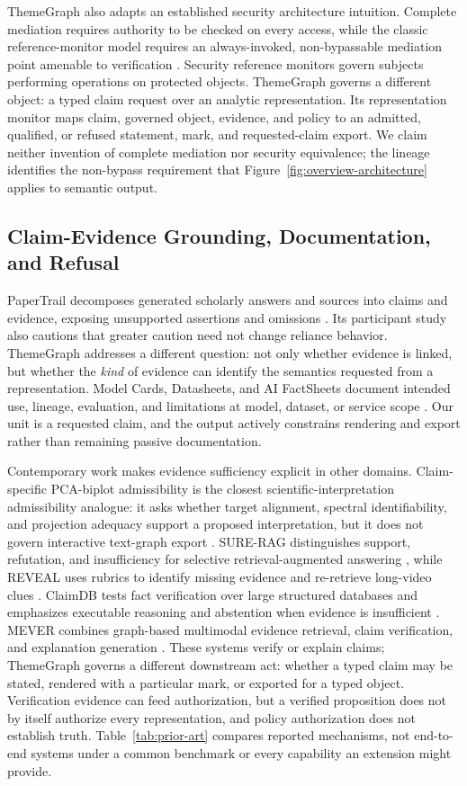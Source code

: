 \documentclass[manuscript,screen,review]{acmart}
\begin{document}
ThemeGraph also adapts an established security architecture intuition. Complete mediation requires authority to be checked on every access, while the classic reference-monitor model requires an always-invoked, non-bypassable mediation point amenable to verification \cite{anderson1972,saltzer1975}. Security reference monitors govern subjects performing operations on protected objects. ThemeGraph governs a different object: a typed claim request over an analytic representation. Its representation monitor maps claim, governed object, evidence, and policy to an admitted, qualified, or refused statement, mark, and requested-claim export. We claim neither invention of complete mediation nor security equivalence; the lineage identifies the non-bypass requirement that Figure~\ref{fig:overview-architecture} applies to semantic output.

\subsection{Claim-Evidence Grounding, Documentation, and Refusal}

PaperTrail decomposes generated scholarly answers and sources into claims and evidence, exposing unsupported assertions and omissions \cite{martinboyle2026}. Its participant study also cautions that greater caution need not change reliance behavior. ThemeGraph addresses a different question: not only whether evidence is linked, but whether the \emph{kind} of evidence can identify the semantics requested from a representation. Model Cards, Datasheets, and AI FactSheets document intended use, lineage, evaluation, and limitations at model, dataset, or service scope \cite{mitchell2019,gebru2021,arnold2019}. Our unit is a requested claim, and the output actively constrains rendering and export rather than remaining passive documentation.

Contemporary work makes evidence sufficiency explicit in other domains. Claim-specific PCA-biplot admissibility is the closest scientific-interpretation admissibility analogue: it asks whether target alignment, spectral identifiability, and projection adequacy support a proposed interpretation, but it does not govern interactive text-graph export \cite{pinto2026}. SURE-RAG distinguishes support, refutation, and insufficiency for selective retrieval-augmented answering \cite{qiu2026}, while REVEAL uses rubrics to identify missing evidence and re-retrieve long-video clues \cite{yan2026}. ClaimDB tests fact verification over large structured databases and emphasizes executable reasoning and abstention when evidence is insufficient \cite{theologitis2026}. MEVER combines graph-based multimodal evidence retrieval, claim verification, and explanation generation \cite{zhang2026mever}. These systems verify or explain claims; ThemeGraph governs a different downstream act: whether a typed claim may be stated, rendered with a particular mark, or exported for a typed object. Verification evidence can feed authorization, but a verified proposition does not by itself authorize every representation, and policy authorization does not establish truth. Table~\ref{tab:prior-art} compares reported mechanisms, not end-to-end systems under a common benchmark or every capability an extension might provide.
\end{document}
